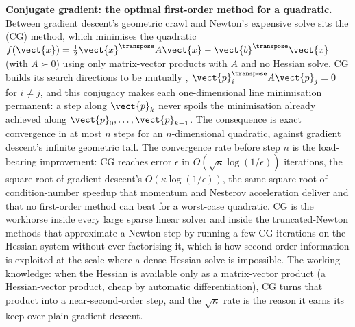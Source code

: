 

\begin{mastery}
\textbf{Conjugate gradient: the optimal first-order method for a
quadratic.} Between gradient descent's geometric crawl and Newton's
expensive solve sits the  (CG) method,
which minimises the quadratic $f(\vect{x}) = \tfrac{1}{2}
\vect{x}^{\transpose} A \vect{x} - \vect{b}^{\transpose} \vect{x}$
(with $A \succ 0$) using only matrix-vector products with $A$ and no
Hessian solve. CG builds its search directions to be mutually
, $\vect{p}_{i}^{\transpose} A \vect{p}_{j} = 0$
for $i \neq j$, and this conjugacy makes each one-dimensional line
minimisation permanent: a step along $\vect{p}_{k}$ never spoils the
minimisation already achieved along $\vect{p}_{0}, \ldots,
\vect{p}_{k-1}$. The consequence is exact convergence in at most $n$
steps for an $n$-dimensional quadratic, against gradient descent's
infinite geometric tail. The convergence rate before step $n$ is the
load-bearing improvement: CG reaches error $\epsilon$ in $O(\sqrt{
\kappa} \log(1/\epsilon))$ iterations, the square root of gradient
descent's $O(\kappa \log(1/\epsilon))$, the same
square-root-of-condition-number speedup that momentum and Nesterov
acceleration deliver and that no first-order method can beat for a
worst-case quadratic. CG is the workhorse inside every large sparse
linear solver and inside the truncated-Newton methods that approximate
a Newton step by running a few CG iterations on the Hessian system
without ever factorising it, which is how second-order information is
exploited at the scale where a dense Hessian solve is impossible. The
working knowledge: when the Hessian is available only as a
matrix-vector product (a Hessian-vector product, cheap by automatic
differentiation), CG turns that product into a near-second-order step,
and the $\sqrt{\kappa}$ rate is the reason it earns its keep over plain
gradient descent.
\end{mastery}

